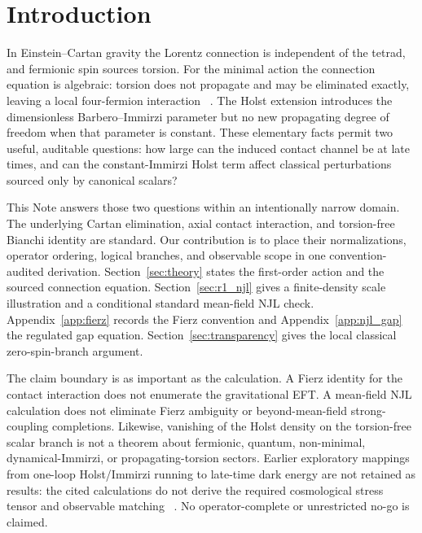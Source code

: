 \documentclass[aps,prd,twocolumn,superscriptaddress,showpacs,preprintnumbers,nofootinbib,longbibliography,floatfix]{revtex4-2}
\begin{document}

\maketitle
\tableofcontents


\section{Introduction}\label{sec:intro}

In Einstein--Cartan gravity the Lorentz connection is independent of the
tetrad, and fermionic spin sources torsion.  For the minimal action the
connection equation is algebraic: torsion does not propagate and may be
eliminated exactly, leaving a local four-fermion interaction
~\cite{Hehl1976,HehlDattaNJL1971,Freidel2005}.  The Holst extension introduces
the dimensionless Barbero--Immirzi parameter but no new propagating degree of
freedom when that parameter is constant.  These elementary facts permit two
useful, auditable questions: how large can the induced contact channel be at
late times, and can the constant-Immirzi Holst term affect classical
perturbations sourced only by canonical scalars?

This Note answers those two questions within an intentionally narrow domain.
The underlying Cartan elimination, axial contact interaction, and torsion-free
Bianchi identity are standard.  Our contribution is to place their
normalizations, operator ordering, logical branches, and observable scope in
one convention-audited derivation.  Section~\ref{sec:theory} states the
first-order action and the sourced connection equation.
Section~\ref{sec:r1_njl} gives a finite-density scale illustration and a
conditional standard mean-field NJL check.  Appendix~\ref{app:fierz} records
the Fierz convention and Appendix~\ref{app:njl_gap} the regulated gap equation.
Section~\ref{sec:transparency} gives the local classical zero-spin-branch
argument.

The claim boundary is as important as the calculation.  A Fierz identity for
the contact interaction does not enumerate the gravitational EFT.  A
mean-field NJL calculation does not eliminate Fierz ambiguity or
beyond-mean-field strong-coupling completions.  Likewise, vanishing of the
Holst density on the torsion-free scalar branch is not a theorem about
fermionic, quantum, non-minimal, dynamical-Immirzi, or propagating-torsion
sectors.  Earlier exploratory mappings from one-loop Holst/Immirzi running to
late-time dark energy are not retained as results: the cited calculations do
not derive the required cosmological stress tensor and observable matching
~\cite{ShapiroTeixeira2014,BenedettiSpeziale2011run}.  No operator-complete or
unrestricted no-go is claimed.
\end{document}
